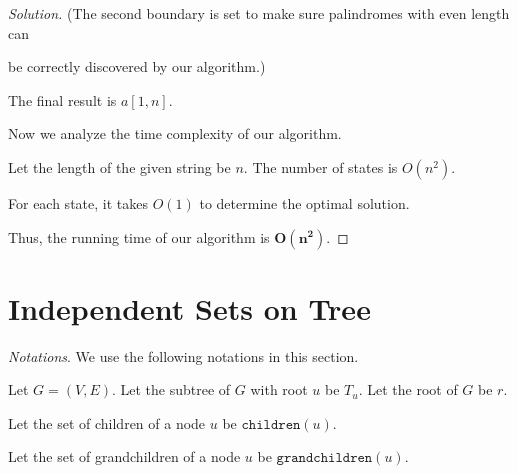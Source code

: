 \documentclass{article}
\newenvironment{solution}{\begin{proof}[\noindent\it Solution]}{\end{proof}}
\begin{document}
\begin{solution}
    \vspace{-1.5em} \hspace{9em}
    (The second boundary is set to make sure palindromes with even length can
    
    \hspace{9.6em}
    be correctly discovered by our algorithm.)
    
    \vspace{1em} \hspace{2.6em}
    The final result is $a[1,n]$.
    
    \vspace{2em} \hspace{2.6em}
    Now we analyze the time complexity of our algorithm. 
    
    \hspace{2.6em}
    Let the length of the given string be $n$. The number of states is $O(n^2).$
    
    \hspace{2.6em}
    For each state, it takes $O(1)$ to determine the optimal solution.
    
    \hspace{2.6em}
    Thus, the running time of our algorithm is  \underline{$\boldsymbol{O(n^2)}.$}
\end{solution}



\vspace{1em}
\section{Independent Sets on Tree}
\vspace{1em}
\textit{Notations}. We use the following notations in this section.

    \hspace{3.2em}
    Let $G=(V,E).$ Let the subtree of $G$ with root $u$ be $T_u$. Let the root of $G$ be $r.$
    
    \hspace{3.2em}
    Let the set of children of a node $u$ be $\mathtt{children}(u)$.
    
    \hspace{3.2em}
    Let the set of grandchildren of a node $u$ be $\mathtt{grandchildren}(u)$.
    
\end{document}
